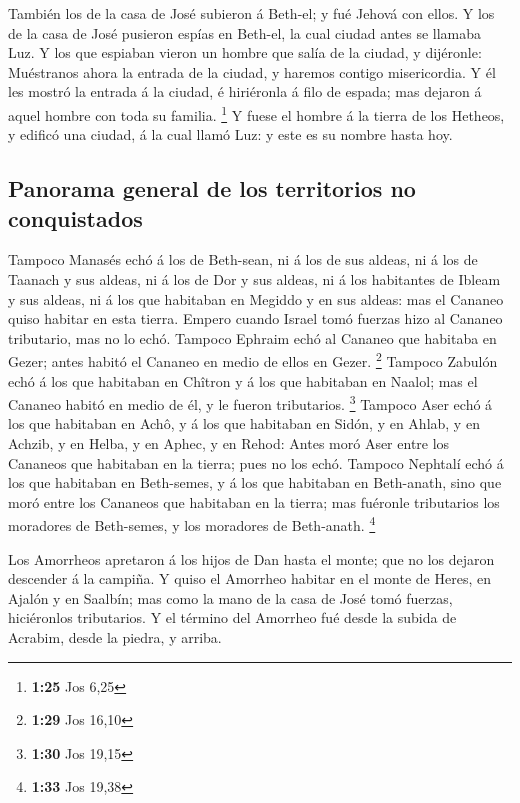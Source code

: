  También los de la casa de José subieron á Beth-el; y fué
Jehová con ellos.  Y los de la casa de José pusieron espías
en Beth-el, la cual ciudad antes se llamaba Luz.  Y los que
espiaban vieron un hombre que salía de la ciudad, y dijéronle:
Muéstranos ahora la entrada de la ciudad, y haremos contigo
misericordia.  Y él les mostró la entrada á la ciudad, é
hiriéronla á filo de espada; mas dejaron á aquel hombre con toda su
familia. \footnote{\textbf{1:25} Jos 6,25}  Y fuese el
hombre á la tierra de los Hetheos, y edificó una ciudad, á la cual llamó
Luz: y este es su nombre hasta hoy.

\hypertarget{panorama-general-de-los-territorios-no-conquistados}{%
\subsection{Panorama general de los territorios no
conquistados}\label{panorama-general-de-los-territorios-no-conquistados}}

 Tampoco Manasés echó á los de Beth-sean, ni á los de sus
aldeas, ni á los de Taanach y sus aldeas, ni á los de Dor y sus aldeas,
ni á los habitantes de Ibleam y sus aldeas, ni á los que habitaban en
Megiddo y en sus aldeas: mas el Cananeo quiso habitar en esta tierra.
 Empero cuando Israel tomó fuerzas hizo al Cananeo
tributario, mas no lo echó.  Tampoco Ephraim echó al
Cananeo que habitaba en Gezer; antes habitó el Cananeo en medio de ellos
en Gezer. \footnote{\textbf{1:29} Jos 16,10}  Tampoco
Zabulón echó á los que habitaban en Chîtron y á los que habitaban en
Naalol; mas el Cananeo habitó en medio de él, y le fueron tributarios.
\footnote{\textbf{1:30} Jos 19,15}  Tampoco Aser echó á los
que habitaban en Achô, y á los que habitaban en Sidón, y en Ahlab, y en
Achzib, y en Helba, y en Aphec, y en Rehod:  Antes moró
Aser entre los Cananeos que habitaban en la tierra; pues no los echó.
 Tampoco Nephtalí echó á los que habitaban en Beth-semes, y
á los que habitaban en Beth-anath, sino que moró entre los Cananeos que
habitaban en la tierra; mas fuéronle tributarios los moradores de
Beth-semes, y los moradores de Beth-anath. \footnote{\textbf{1:33} Jos
  19,38}

 Los Amorrheos apretaron á los hijos de Dan hasta el monte;
que no los dejaron descender á la campiña.  Y quiso el
Amorrheo habitar en el monte de Heres, en Ajalón y en Saalbín; mas como
la mano de la casa de José tomó fuerzas, hiciéronlos tributarios.
 Y el término del Amorrheo fué desde la subida de Acrabim,
desde la piedra, y arriba.

